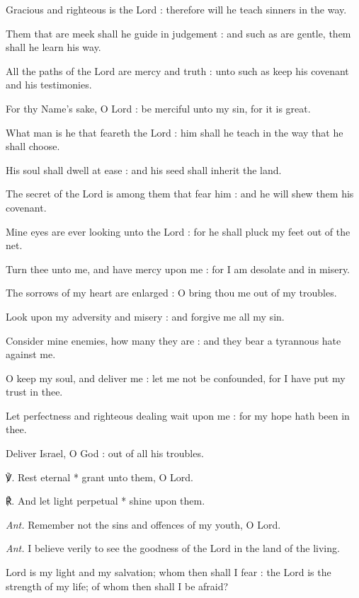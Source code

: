 Gracious and righteous is the Lord : therefore will he teach sinners in the way.\par
{}Them that are meek shall he guide in judgement : and such as are gentle, them shall he learn his way.\par
{}All the paths of the Lord are mercy and truth : unto such as keep his covenant and his testimonies.\par
{}For thy Name's sake, O Lord : be merciful unto my sin, for it is great.\par
{}What man is he that feareth the Lord : him shall he teach in the way that he shall choose.\par
{}His soul shall dwell at ease : and his seed shall inherit the land.\par
{}The secret of the Lord is among them that fear him : and he will shew them his covenant.\par
{}Mine eyes are ever looking unto the Lord : for he shall pluck my feet out of the net.\par
{}Turn thee unto me, and have mercy upon me : for I am desolate and in misery.\par
{}The sorrows of my heart are enlarged : O bring thou me out of my troubles.\par
{}Look upon my adversity and misery : and forgive me all my sin.\par
{}Consider mine enemies, how many they are : and they bear a tyrannous hate against me.\par
{}O keep my soul, and deliver me : let me not be confounded, for I have put my trust in thee.\par
{}Let perfectness and righteous dealing wait upon me : for my hope hath been in thee.\par
{}Deliver Israel, O God : out of all his troubles.\par
℣. Rest eternal * grant unto them, O Lord.\par
℟. And let light perpetual * shine upon them.\par\noindent
\textit{Ant.} Remember not the sins and offences of my youth, O Lord.\par
{}\par\noindent
\textit{Ant.} I believe {\dag} verily to see the goodness of the Lord in the land of the living.\par
{} Lord is my light and my salvation; whom then shall I fear : the Lord is the strength of my life; of whom then shall I be afraid?\par
